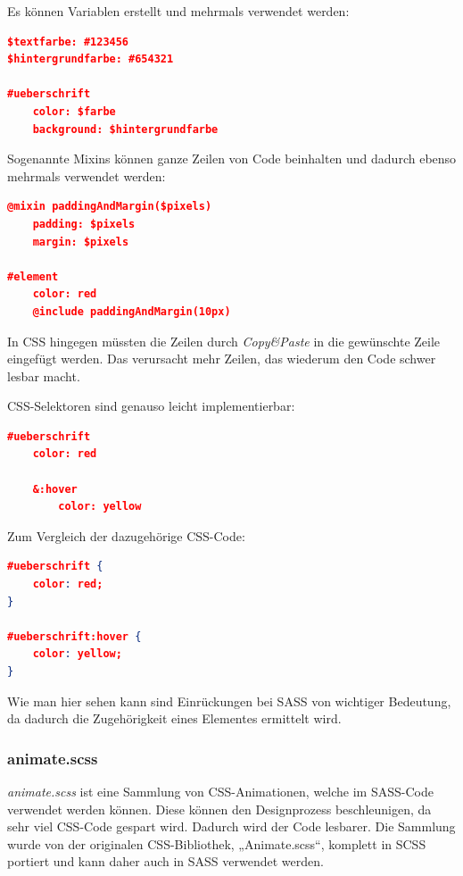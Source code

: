 Es können Variablen erstellt und mehrmals verwendet werden:

\begin{lstlisting}[language=json, caption={SASS - Anwendung von Variablen}]
$textfarbe: #123456
$hintergrundfarbe: #654321

#ueberschrift
    color: $farbe
    background: $hintergrundfarbe
\end{lstlisting}

Sogenannte Mixins können ganze Zeilen von Code beinhalten und dadurch ebenso mehrmals verwendet werden:

\lstset{escapechar=?,style=customjava}
\begin{lstlisting}[language=json, caption={SASS - Anwendung von Mixins}]
@mixin paddingAndMargin($pixels)
    padding: $pixels
    margin: $pixels
    
#element
    color: red
    @include paddingAndMargin(10px)
\end{lstlisting}

In CSS hingegen müssten die Zeilen durch \textit{Copy\&Paste} in die gewünschte Zeile eingefügt werden. Das verursacht mehr Zeilen, das wiederum den Code schwer lesbar macht.

CSS-Selektoren sind genauso leicht implementierbar:
\begin{lstlisting}[language=json, caption={SASS und CSS Vergleich - CSS Selektoren}]
#ueberschrift
    color: red
    
    &:hover
        color: yellow
\end{lstlisting}

Zum Vergleich der dazugehörige CSS-Code:
\begin{lstlisting}[language=json, caption={SASS und CSS Vergleich - CSS Selektoren}]
#ueberschrift {
    color: red;
}

#ueberschrift:hover {
    color: yellow;
}
\end{lstlisting}
\lstset{escapechar=@,style=customjava}


Wie man hier sehen kann sind Einrückungen bei SASS von wichtiger Bedeutung, da dadurch die Zugehörigkeit eines Elementes ermittelt wird.
\subsubsection{animate.scss}
\textit{animate.scss} ist eine Sammlung von CSS-Animationen, welche im SASS-Code verwendet werden können. Diese können den Designprozess beschleunigen, da sehr viel CSS-Code gespart wird. Dadurch wird der Code lesbarer. Die Sammlung wurde von der originalen CSS-Bibliothek, „Animate.scss“, komplett in SCSS portiert und kann daher auch in SASS verwendet werden.

